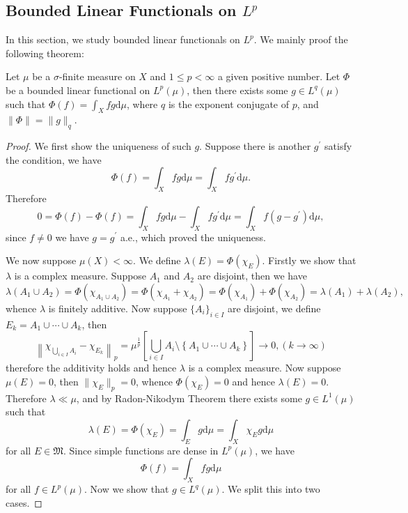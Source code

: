 \subsection{Bounded Linear Functionals on $L^p$}
In this section, we study bounded linear functionals on $L^p$. We mainly proof the following theorem: 
\begin{theorem}
Let $\mu$ be a $\sigma$-finite measure on $X$ and $1\le p<\infty$ a given positive number. Let $\Phi$ be a bounded linear functional on $L^p(\mu)$, then there exists some $g\in L^q(\mu)$ such that $\Phi(f)=\int_Xfg\mathrm{d}\mu$, where $q$ is the exponent conjugate of $p$, and $\|\Phi\|=\|g\|_q$.
\end{theorem}
\begin{proof}
We first show the uniqueness of such $g$. Suppose there is another $g^\prime$ satisfy the condition, we have 
$$
\Phi \left( f \right) =\int_X{fg\mathrm{d}\mu}=\int_X{fg^{\prime}\mathrm{d}\mu}.
$$
Therefore 
$$
0=\Phi \left( f \right) -\Phi \left( f \right) =\int_X{fg\mathrm{d}\mu}-\int_X{fg^{\prime}\mathrm{d}\mu}=\int_X{f\left( g-g^{\prime} \right) \mathrm{d}\mu},
$$
since $f\ne 0$ we have $g=g^\prime$ a.e., which proved the uniqueness.\par
We now suppose $\mu(X)<\infty$. We define $\lambda(E)=\Phi(\chi_E)$. Firstly we show that $\lambda$ is a complex measure. Suppose $A_1$ and $A_2$ are disjoint, then we have 
$$
\lambda \left( A_1\cup A_2 \right) =\Phi \left( \chi _{A_1\cup A_2} \right) =\Phi \left( \chi _{A_1}+\chi _{A_2} \right) =\Phi \left( \chi _{A_1} \right) +\Phi \left( \chi _{A_2} \right) =\lambda \left( A_1 \right) +\lambda \left( A_2 \right) ,
$$
whence $\lambda$ is finitely additive. Now suppose $\{A_i\}_{i\in I}$ are disjoint, we define $E_k=A_1\cup\cdots\cup A_k$, then 
$$
\left\| \chi _{\bigcup_{i\in I}{A_i}}-\chi _{E_k} \right\| _p=\mu ^{\frac{1}{p}}\left[ \bigcup_{i\in I}{A_i}\setminus \left\{ A_1\cup \cdots \cup A_k \right\} \right] \rightarrow 0,\left( k\rightarrow \infty \right) 
$$
therefore the additivity holds and hence $\lambda$ is a complex measure. Now suppose $\mu(E)=0$, then $\|\chi_E\|_p=0$, whence $\Phi(\chi_E)=0$ and hence $\lambda(E)=0$. Therefore $\lambda\ll\mu$, and by Radon-Nikodym Theorem there exists some $g\in L^1(\mu)$ such that 
$$
\lambda \left( E \right) =\Phi \left( \chi _E \right) =\int_E{g\mathrm{d}\mu}=\int_X{\chi _Eg\mathrm{d}\mu}
$$
for all $E\in\mathfrak{M}$. Since simple functions are dense in $L^p(\mu)$, we have 
$$
\Phi \left( f \right) =\int_X{fg\mathrm{d}\mu}
$$
for all $f\in L^p(\mu)$. Now we show that $g\in L^q(\mu)$. We split this into two cases.\par

\end{proof}
